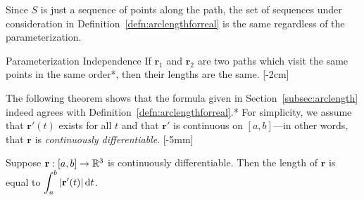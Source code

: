 \documentclass{watsonbook}
\begin{document}
  Since $S$ is just a sequence of points along the path, the set of
  sequences under consideration in
  Definition~\ref{defn:arclengthforreal} is the same regardless of
  the parameterization.

  \begin{theo}{Parameterization Independence}{}
    If $\mathbf{r}_1$ and $\mathbf{r}_2$ are two paths which visit the
    same points in the same order*, then their lengths are the
    same. [-2cm]
  \end{theo}

  The following theorem shows that the formula given in
  Section~\ref{subsec:arclength} indeed agrees with
  Definition~\ref{defn:arclengthforreal}.* For simplicity, we assume
  that $\mathbf{r}'(t)$ exists for all $t$ and that $\mathbf{r}'$ is
  continuous on $[a,b]$---in other words, that $\mathbf{r}$ is
  \textit{continuously differentiable}.  [-5mm]
  
  \begin{theo}{}{}
    Suppose $\mathbf{r}:[a,b] \to \mathbb{R}^3$ is continuously
    differentiable. Then the length of $\mathbf{r}$ is equal to
    $\displaystyle{\int_a^b |\mathbf{r}'(t)| \, \mathrm{d}t}$.
  \end{theo}
\end{document}

